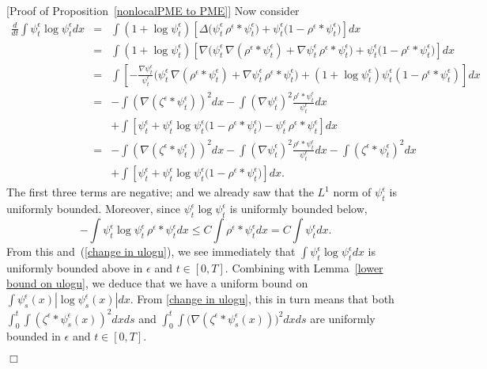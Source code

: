 \documentclass[12pt]{article}
\newenvironment {proof}{{\noindent\bf Proof }}{\hfill $\Box$ \medskip}
\numberwithin{equation}{section}
\begin{document}
\begin{proof}[Proof of Proposition~\ref{nonlocalPME to PME}]
Now consider
\begin{eqnarray}
	\frac{d}{dt}\int \psi_t^\epsilon\log \psi_t^\epsilon dx &=&
	\int (1+\log \psi_t^\epsilon)\left[\Delta \big(\psi_t^\epsilon\,
	\rho^{\epsilon}*\psi_t^\epsilon\big)
	+\psi_t^\epsilon\big(1-\rho^{\epsilon}*\psi_t^\epsilon\big)\right]
dx
\nonumber
\\
&=&
	\int (1+\log \psi_t^\epsilon)\left[\nabla\Big(\psi_t^\epsilon\,
	\nabla(\rho^{\epsilon}*\psi_t^\epsilon)+
	\nabla \psi_t^\epsilon\, \rho^{\epsilon}*\psi_t^\epsilon\Big)
	+\psi_t^\epsilon\big(1-\rho^{\epsilon}*\psi_t^\epsilon\big)\right]  dx
\nonumber
	\\
&=&
\int \left[-\frac{\nabla \psi_t^\epsilon}{\psi_t^\epsilon}
\Big(\psi_t^\epsilon\, \nabla(\rho^{\epsilon}*\psi_t^\epsilon)
+\nabla \psi_t^\epsilon\, \rho^{\epsilon}*\psi_t^\epsilon\Big)+
(1+\log \psi_t^\epsilon)\psi_t^\epsilon(1-\rho^{\epsilon}*\psi_t^\epsilon)\right] d x
\nonumber
	\\
&=&
-\int \left(\nabla (\zeta^{\epsilon}*\psi_t^\epsilon)\right)^2  dx
-\int (\nabla \psi_t^\epsilon)^2\frac{\rho^{\epsilon}*\psi_t^\epsilon}{\psi_t^\epsilon}  dx
\nonumber
	\\
&&+\int
\left[\psi_t^\epsilon+\psi_t^\epsilon\log \psi_t^\epsilon
\big(1-\rho^{\epsilon}*\psi_t^\epsilon\big)
-\psi_t^\epsilon\, \rho^{\epsilon}*\psi_t^\epsilon\right] dx
\nonumber
	\\
&=&
-\int \left(\nabla (\zeta^{\epsilon}*\psi_t^\epsilon)\right)^2  dx
-\int (\nabla \psi_t^\epsilon)^2\frac{\rho^{\epsilon}*\psi_t^\epsilon}{\psi_t^\epsilon} dx
-\int (\zeta^{\epsilon}*\psi_t^\epsilon)^2  dx
\nonumber
	\\
&&+\int
\left[\psi_t^\epsilon+\psi_t^\epsilon\log \psi_t^\epsilon
\big(1-\rho^{\epsilon}*\psi_t^\epsilon\big)
\right] dx .
	\label{change in ulogu}
\end{eqnarray}
The first three terms are negative; and we already
saw that the $L^1$ norm
of $\psi_t^\epsilon$ is uniformly bounded.
%
Moreover, since $\psi_t^\epsilon\log \psi_t^\epsilon$ is uniformly bounded below,
$$
    -\int \psi_t^\epsilon \log \psi_t^\epsilon \, \rho^{\epsilon}*\psi_t^\epsilon dx
    \leq
    C\int \rho^{\epsilon}*\psi_t^\epsilon dx
    =
    C \int \psi_t^\epsilon dx.
$$
From this and~(\ref{change in ulogu}),
we see immediately that $\int \psi_t^\epsilon \log \psi_t^\epsilon dx$
is uniformly bounded
above in $\epsilon$ and $t\in [0,T]$. 
Combining with Lemma~\ref{lower bound on ulogu},
we deduce that
we have a uniform bound on $\int \psi_s^\epsilon(x)|\log \psi_s^\epsilon(x)| d x$.
From \eqref{change in ulogu}, this in turn means that both
$\int_0^t \int(\zeta^{\epsilon}*\psi_s^\epsilon(x))^2  dx ds$ and
$\int_0^t \int \big(\nabla (\zeta^{\epsilon}*\psi_s^\epsilon(x))\big)^2  dx ds$
are uniformly bounded in
$\epsilon$ and $t\in [0,T]$.


\end{proof}
\end{document}
